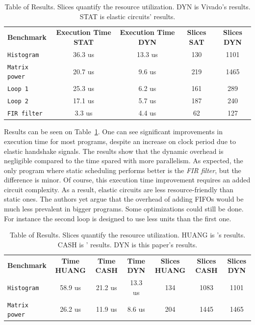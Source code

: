 \documentclass{article}
\begin{document}
\begin{table}
  \hspace{-2cm}
  \begin{tabular}{l c c c c}
    \textbf{Benchmark} & \textbf{Execution Time STAT} & \textbf{Execution Time DYN} & \textbf{Slices SAT} & \textbf{Slices DYN}\\
    \texttt{Histogram} & 36.3 us & 13.3 us & 130 & 1101\\
    \texttt{Matrix power} & 20.7 us & 9.6 us & 219 & 1465\\
    \texttt{Loop 1} & 25.3 us & 6.2 us & 161 & 289\\
    \texttt{Loop 2} & 17.1 us & 5.7 us & 187 & 240\\
    \texttt{FIR filter} & 3.3 us & 4.4 us & 62 & 127
  \end{tabular}
  \caption{Table of Results. Slices quantify the resource utilization. DYN is Vivado's results. STAT is elastic circuits' results.}
  \label{table:results_stat}
\end{table}

Results can be seen on Table~\ref{table:results_stat}. One can see significant improvements in execution time for most programs, despite an increase on clock period due to elastic handshake signals.
The results show that the dynamic overhead is negligible compared to the time spared with more parallelism. As expected, the only program where static scheduling performs better is the \textit{FIR filter}, but the difference is minor.
Of course, this execution time improvement requires an added circuit complexity. As a result, elastic circuits are less resource-friendly than static ones. The authors yet argue that the overhead of adding FIFOs would be much less prevalent in bigger programs. Some optimizations could still be done. For instance the second loop is designed to use less units than the first one.

\begin{table}
  \hspace{-3cm}
  \begin{tabular}{l c c c c c c}
    \textbf{Benchmark} & \textbf{Time HUANG} & \textbf{Time CASH} & \textbf{Time DYN} & \textbf{Slices HUANG} & \textbf{Slices CASH} & \textbf{Slices DYN}\\
    \texttt{Histogram} & 58.9 us & 21.2 us & 13.3 us & 134 & 1083 & 1101\\
    \texttt{Matrix power} & 26.2 us & 11.9 us & 8.6 us & 204 & 1445 & 1465
  \end{tabular}
  \caption{Table of Results. Slices quantify the resource utilization. HUANG is \cite{DBLP:conf/fpga/HuangITCW13}'s results. CASH is \cite{budiu-tr02}' results. DYN is this paper's results.}
  \label{table:results_dyn}
\end{table}
\end{document}
